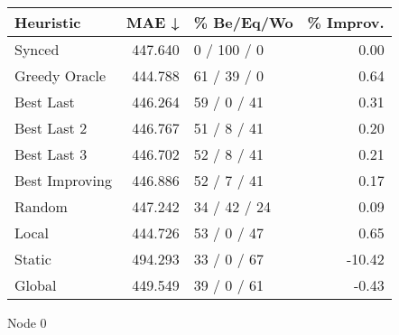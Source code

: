 \begin{tabular}{lrlr}
\toprule
\textbf{Heuristic} & \textbf{MAE ↓} & \textbf{\% Be/Eq/Wo} & \textbf{\% Improv.} \\
\midrule
            Synced &        447.640 &          0 / 100 / 0 &                0.00 \\
     Greedy Oracle &        444.788 &          61 / 39 / 0 &                0.64 \\
         Best Last &        446.264 &          59 / 0 / 41 &                0.31 \\
       Best Last 2 &        446.767 &          51 / 8 / 41 &                0.20 \\
       Best Last 3 &        446.702 &          52 / 8 / 41 &                0.21 \\
    Best Improving &        446.886 &          52 / 7 / 41 &                0.17 \\
            Random &        447.242 &         34 / 42 / 24 &                0.09 \\
             Local &        444.726 &          53 / 0 / 47 &                0.65 \\
            Static &        494.293 &          33 / 0 / 67 &              -10.42 \\
            Global &        449.549 &          39 / 0 / 61 &               -0.43 \\
\bottomrule
\end{tabular}
\caption{Node 0}
\label{tab:non_lr01_le2_bs2_0}
